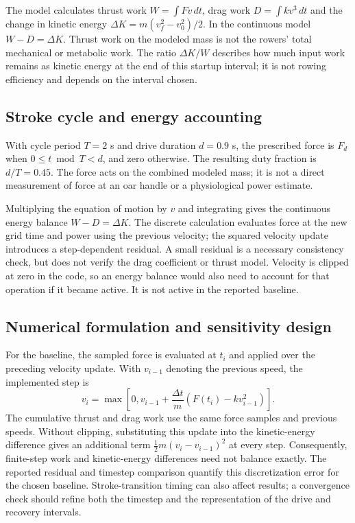 \documentclass[11pt]{article}
\begin{document}
The model calculates thrust work $W=\int Fv\,dt$, drag work $D=\int kv^3\,dt$ and the change in kinetic energy $\Delta K=m(v_f^2-v_0^2)/2$. In the continuous model $W-D=\Delta K$. Thrust work on the modeled mass is not the rowers' total mechanical or metabolic work. The ratio $\Delta K/W$ describes how much input work remains as kinetic energy at the end of this startup interval; it is not rowing efficiency and depends on the interval chosen.
\subsection{Stroke cycle and energy accounting}
With cycle period $T=2$ s and drive duration $d=0.9$ s, the prescribed force is $F_d$ when $0\leq t\bmod T<d$, and zero otherwise. The resulting duty fraction is $d/T=0.45$. The force acts on the combined modeled mass; it is not a direct measurement of force at an oar handle or a physiological power estimate.

Multiplying the equation of motion by $v$ and integrating gives the continuous energy balance $W-D=\Delta K$. The discrete calculation evaluates force at the new grid time and power using the previous velocity; the squared velocity update introduces a step-dependent residual. A small residual is a necessary consistency check, but does not verify the drag coefficient or thrust model. Velocity is clipped at zero in the code, so an energy balance would also need to account for that operation if it became active. It is not active in the reported baseline.

\subsection{Numerical formulation and sensitivity design}
For the baseline, the sampled force is evaluated at $t_i$ and applied over the preceding velocity update. With $v_{i-1}$ denoting the previous speed, the implemented step is
\begin{equation}
 v_i=\max\left[0,v_{i-1}+\frac{\Delta t}{m}(F(t_i)-kv_{i-1}^2)\right].
\end{equation}
The cumulative thrust and drag work use the same force samples and previous speeds. Without clipping, substituting this update into the kinetic-energy difference gives an additional term $\tfrac12m(v_i-v_{i-1})^2$ at every step. Consequently, finite-step work and kinetic-energy differences need not balance exactly. The reported residual and timestep comparison quantify this discretization error for the chosen baseline. Stroke-transition timing can also affect results; a convergence check should refine both the timestep and the representation of the drive and recovery intervals.
\end{document}
